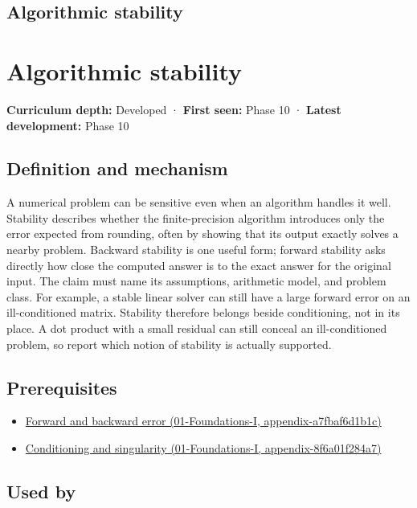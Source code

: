 \hypertarget{appendix-aa2bf0d79639}{}
\section*{Algorithmic stability}
\chapter{Algorithmic stability}\label{appendix-aa2bf0d79639-algorithmic-stability}

\textbf{Curriculum depth:} Developed · \textbf{First seen:} Phase 10 · \textbf{Latest development:} Phase 10

\section{Definition and mechanism}\label{appendix-aa2bf0d79639-definition-and-mechanism}

A numerical problem can be sensitive even when an algorithm handles it well. Stability describes whether the finite-precision algorithm introduces only the error expected from rounding, often by showing that its output exactly solves a nearby problem. Backward stability is one useful form; forward stability asks directly how close the computed answer is to the exact answer for the original input. The claim must name its assumptions, arithmetic model, and problem class. For example, a stable linear solver can still have a large forward error on an ill-conditioned matrix. Stability therefore belongs beside conditioning, not in its place. A dot product with a small residual can still conceal an ill-conditioned problem, so report which notion of stability is actually supported.

\section{Prerequisites}\label{appendix-aa2bf0d79639-prerequisites}

\begin{itemize}
\tightlist
\item
  \href{../01-Foundations-I/main.pdf\#nameddest=appendix-a7fbaf6d1b1c}{Forward and backward error (01-Foundations-I, appendix-a7fbaf6d1b1c)}
\item
  \href{../01-Foundations-I/main.pdf\#nameddest=appendix-8f6a01f284a7}{Conditioning and singularity (01-Foundations-I, appendix-8f6a01f284a7)}
\end{itemize}

\section{Used by}\label{appendix-aa2bf0d79639-used-by}

